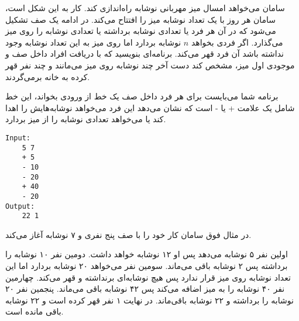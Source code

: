 

سامان می‌خواهد امسال میز مهربانی نوشابه راه‌اندازی کند. کار به این شکل است، سامان هر روز با یک تعداد نوشابه میز را افتتاح می‌کند.
در ادامه یک صف تشکیل می‌شود که در آن هر فرد یا تعدادی نوشابه برداشته یا تعدادی نوشابه را روی میز می‌گذارد.
اگر فردی بخواهد $n$ نوشابه بردارد اما روی میز به این تعداد نوشابه وجود نداشته باشد آن فرد قهر می‌کند.
برنامه‌ای بنویسید که با دریافت افراد داخل صف و موجودی اول میز، مشخص کند دست آخر چند نوشابه روی میز می‌مانند و چند نفر قهر کرده به خانه برمی‌گردند.

برنامه شما می‌بایست برای هر فرد داخل صف یک خط از ورودی بخواند، این خط شامل یک علامت + یا -‌ است که نشان می‌دهد این فرد می‌خواهد نوشابه‌هایش را اهدا کند یا می‌خواهد تعدادی نوشابه را از میز بردارد.

\begin{latin}
\begin{verbatim}
Input:
    5 7
    + 5
    - 10
    - 20
    + 40
    - 20
Output:
    22 1
\end{verbatim}
\end{latin}

در مثال فوق سامان کار خود را با صف پنج نفری و ۷ نوشابه آغاز می‌کند.

 اولین نفر ۵ نوشابه می‌دهد پس او ۱۲ نوشابه خواهد داشت.
 دومین نفر ۱۰ نوشابه را برداشته پس ۲ نوشابه باقی می‌ماند.
 سومین نفر می‌خواهد ۲۰ نوشابه بردارد اما این تعداد نوشابه روی میز قرار ندارد پس هیچ نوشابه‌ای برنداشته و قهر می‌کند.
 چهارمین نفر ۴۰ نوشابه را به میز اضافه می‌کند پس ۴۲ نوشابه باقی می‌ماند.
 پنجمین نفر ۲۰ نوشابه را برداشته و ۲۲ نوشابه باقی‌ماند. در نهایت ۱ نفر قهر کرده است و ۲۲ نوشابه باقی مانده است.
